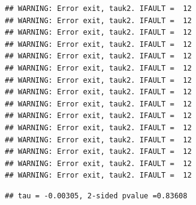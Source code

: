 \documentclass[
  12pt,
]{article}
\newenvironment{Shaded}{\begin{snugshade}}{\end{snugshade}}
\newcommand{\AttributeTok}[1]{\textcolor[rgb]{0.77,0.63,0.00}{#1}}
\newcommand{\CommentTok}[1]{\textcolor[rgb]{0.56,0.35,0.01}{\textit{#1}}}
\newcommand{\DecValTok}[1]{\textcolor[rgb]{0.00,0.00,0.81}{#1}}
\newcommand{\FunctionTok}[1]{\textcolor[rgb]{0.00,0.00,0.00}{#1}}
\newcommand{\NormalTok}[1]{#1}
\newcommand{\OtherTok}[1]{\textcolor[rgb]{0.56,0.35,0.01}{#1}}
\newcommand{\SpecialCharTok}[1]{\textcolor[rgb]{0.00,0.00,0.00}{#1}}
\begin{document}
\begin{verbatim}
## WARNING: Error exit, tauk2. IFAULT =  12
## WARNING: Error exit, tauk2. IFAULT =  12
## WARNING: Error exit, tauk2. IFAULT =  12
## WARNING: Error exit, tauk2. IFAULT =  12
## WARNING: Error exit, tauk2. IFAULT =  12
## WARNING: Error exit, tauk2. IFAULT =  12
## WARNING: Error exit, tauk2. IFAULT =  12
## WARNING: Error exit, tauk2. IFAULT =  12
## WARNING: Error exit, tauk2. IFAULT =  12
## WARNING: Error exit, tauk2. IFAULT =  12
## WARNING: Error exit, tauk2. IFAULT =  12
## WARNING: Error exit, tauk2. IFAULT =  12
## WARNING: Error exit, tauk2. IFAULT =  12
## WARNING: Error exit, tauk2. IFAULT =  12
## WARNING: Error exit, tauk2. IFAULT =  12
\end{verbatim}

\begin{verbatim}
## tau = -0.00305, 2-sided pvalue =0.83608
\end{verbatim}

\begin{Shaded}
\end{Shaded}
\end{document}
